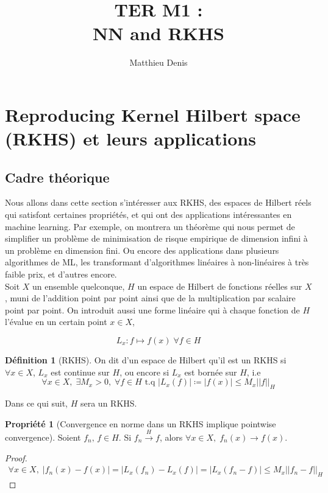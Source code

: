 \documentclass[a4paper, 11pt, french]{article}
\title{TER M1 : \\ NN and RKHS}
\author{Matthieu Denis}
\theoremstyle{definition}
\newtheorem{definition}{Définition}
\newtheorem{property}{Propriété}
\begin{document}
	
	\maketitle
	\newpage
	
	\tableofcontents
	\newpage
	
	\section{Reproducing Kernel Hilbert space (RKHS) et leurs applications}
	
	\subsection{Cadre théorique}
	
	Nous allons dans cette section s'intéresser aux RKHS, des espaces de Hilbert réels qui satisfont certaines propriétés, et qui ont des applications intéressantes en machine learning. Par exemple, on montrera un théorème qui nous permet de simplifier un problème de minimisation de risque empirique de dimension infini à un problème en dimension fini. Ou encore des applications dans plusieurs algorithmes de ML, les transformant d'algorithmes linéaires à non-linéaires à très faible prix, et d'autres encore. \\
	
	Soit $X$ un ensemble quelconque, $H$ un espace de Hilbert de fonctions réelles sur $X$, muni de l'addition point par point ainsi que de la multiplication par scalaire point par point. On introduit aussi une forme linéaire qui à chaque fonction de $H$ l'évalue en un certain point $x \in X$,
	
	\[L_x : f \mapsto f(x) \; \forall f \in H\]
		
	\begin{definition}[RKHS]
		On dit d'un espace de Hilbert qu'il est un RKHS si $\forall x \in X$, $L_x$ est continue sur $H$, ou encore si $L_x$ est bornée sur $H$, i.e
		\[\forall x \in X, \;  \exists M_x > 0, \; \forall f \in H \text{ t.q } |L_x(f)| \coloneqq |f(x)| \leq M_x ||f||_H\]
	\end{definition}

	Dans ce qui suit, $H$ sera un RKHS.

	\begin{property}[Convergence en norme dans un RKHS implique pointwise convergence]
		Soient $f_n, \, f \in H$. Si $f_n \stackrel{H}{\to} f$, alors $\forall x \in X, \; f_n(x) \to f(x)$.
	\end{property}
	\begin{proof}
		\begin{align*}
			\forall x \in X, \; |f_n(x) - f(x)| = |L_x(f_n) - L_x(f)| = |L_x(f_n - f)| \leq M_x||f_n - f||_H
		\end{align*}
	\end{proof}
\end{document}
